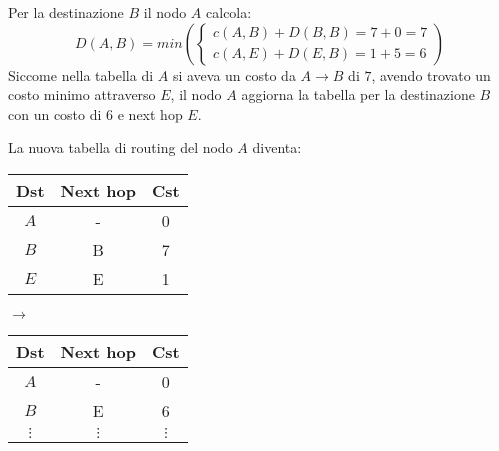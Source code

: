 \documentclass[a4paper]{article}
\begin{document}
\begin{itemize}
\begin{example}
    \noindent
    Per la destinazione \( B \) il nodo \( A \) calcola:
    \[
      D(A,B) = min \left( 
      \begin{cases}
        c(A,B) + D(B,B) = 7 + 0 = 7\\
        c(A,E) + D(E,B) = 1 + 5 = 6
      \end{cases}
    \right) 
    \] 
    Siccome nella tabella di \( A \) si aveva un costo da \( A \to B \) di \( 7 \),
    avendo trovato un costo minimo attraverso \( E \), il nodo \( A \) aggiorna la tabella
    per la destinazione \( B \) con un costo di \( 6 \) e next hop \( E \).

    La nuova tabella di routing del nodo \( A \) diventa:
    \begin{table}[H]
      \centering
      \begin{tabular}{c|c|c}
        \textbf{Dst} & \textbf{Next hop} & \textbf{Cst} \\
        \hline
        \( A \) & - & 0 \\
        \( B \) & B & 7 \\
        \( E \) & E & 1 \\
      \end{tabular}
      \( \to \) 
      \begin{tabular}{c|c|c}
        \textbf{Dst} & \textbf{Next hop} & \textbf{Cst} \\
        \hline
        \( A \) & - & 0 \\
        \( B \) & E & 6 \\
        \( \vdots \) & \( \vdots \)  & \( \vdots \)
      \end{tabular}
    \end{table}


\end{example}
\end{itemize}
\end{document}
